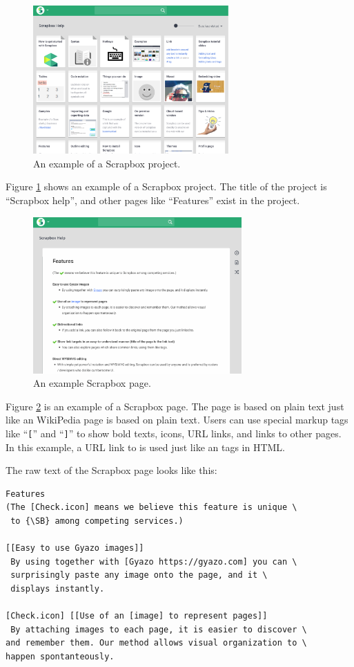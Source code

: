 \documentclass[conference]{IEEEtran}
\def\SB{Scrapbox}
\begin{document}
\begin{figure}[H]
\centerline{\includegraphics[width=75mm,bb=0 0 1553 1174]{figures/28818d749896f87f3eb8bd6b6f9e9a36.png}}
\caption{An example of a {\SB} project.}
\label{exampleproject}
\end{figure}

Figure \ref{exampleproject} shows an example of a {\SB} project.
The title of the project is ``Scrapbox help'', and
other pages like ``Features'' exist in the project.

\begin{figure}[H]
\centerline{\includegraphics[width=80mm,bb=0 0 1606 1200]{figures/9e867c325bafc415bd0870c1717fbaf7.png}}
\caption{An example {\SB} page.}
\label{examplepage}
\end{figure}

Figure \ref{examplepage} is an example of a {\SB} page.
%
The page is based on plain text just like an WikiPedia page is based on plain text.
Users can use special markup tags
like ``\texttt{[}'' and ``\texttt{]}'' to show bold texts, icons, URL links,
and links to other pages.
In this example, a URL link to {} is used
just like an  tags in HTML.

The raw text of the {\SB} page looks like this:

{\scriptsize
\begin{verbatim}
Features
(The [Check.icon] means we believe this feature is unique \
 to {\SB} among competing services.)

[[Easy to use Gyazo images]]
 By using together with [Gyazo https://gyazo.com] you can \
 surprisingly paste any image onto the page, and it \
 displays instantly.

[Check.icon] [[Use of an [image] to represent pages]]
 By attaching images to each page, it is easier to discover \
and remember them. Our method allows visual organization to \
happen spontanteously.
\end{verbatim}
}
\end{document}
